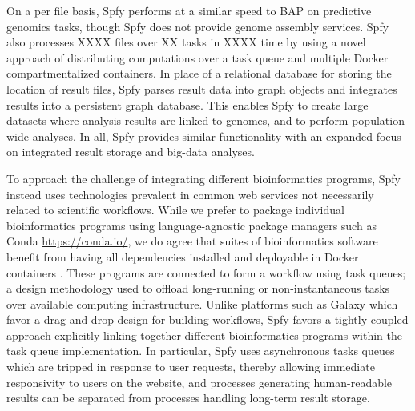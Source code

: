 \documentclass{article}
\begin{document}
On a per file basis, Spfy performs at a similar speed to BAP on predictive genomics tasks, though Spfy does not provide genome assembly services.
Spfy also processes XXXX files over XX tasks in XXXX time by using a novel approach of distributing computations over a task queue and multiple Docker compartmentalized containers.
In place of a relational database for storing the location of result files, Spfy parses result data into graph objects and integrates results into a persistent graph database.
This enables Spfy to create large datasets where analysis results are linked to genomes, and to perform population-wide analyses. In all, Spfy provides similar functionality with an expanded focus on integrated result storage and big-data analyses.

To approach the challenge of integrating different bioinformatics programs, Spfy instead uses technologies prevalent in common web services not necessarily related to scientific workflows.
While we prefer to package individual bioinformatics programs using language-agnostic package managers such as Conda \url{https://conda.io/}, we do agree that suites of bioinformatics software benefit from having all dependencies installed and deployable in Docker containers \cite{di2015impact}.
These programs are connected to form a workflow using task queues; a design methodology used to offload long-running or non-instantaneous tasks over available computing infrastructure.
Unlike platforms such as Galaxy which favor a drag-and-drop design for building workflows, Spfy favors a tightly coupled approach explicitly linking together different bioinformatics programs within the task queue implementation.
In particular, Spfy uses asynchronous tasks queues which are tripped in response to user requests, thereby allowing immediate responsivity to users on the website, and processes generating human-readable results can be separated from processes handling long-term result storage.
\end{document}
